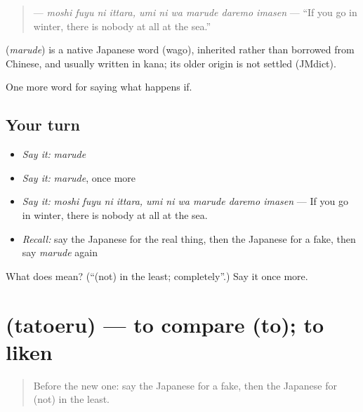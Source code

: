 \begin{quote}
\textbf{     } — \emph{moshi fuyu ni ittara, umi ni wa marude daremo imasen} — \textquotedblleft{}If you go in winter, there is nobody at all at the sea.\textquotedblright{}
\end{quote}

\begin{cousinweb}
\textbf{} (\emph{marude}) is a native Japanese word (wago), inherited rather than borrowed from Chinese, and usually written in kana; its older origin is not settled (JMdict).
\end{cousinweb}

\begin{grammarlens}[title={What you've built}]
One more word for saying what happens if.
\end{grammarlens}

\subsection*{Your turn}
\begin{itemize}
\raggedright
  \item \emph{Say it:} \emph{marude}
  \item \emph{Say it:} \emph{marude}, once more
  \item \emph{Say it:} \emph{moshi fuyu ni ittara, umi ni wa marude daremo imasen} — If you go in winter, there is nobody at all at the sea.
  \item \emph{Recall:} say the Japanese for the real thing, then the Japanese for a fake, then say \emph{marude} again
\end{itemize}

\begin{tcolorbox}[breakable,colback=teal!4,colframe=teal!35!black,title={Before you move on}]
What does  mean? (\textquotedblleft{}(not) in the least; completely\textquotedblright{}.) Say it once more.
\end{tcolorbox}
\section[\texorpdfstring{\ja{たとえる} (tatoeru)}{たとえる (tatoeru)}]{ (tatoeru) — to compare (to); to liken}

\label{lesson:JA-C525-tatoeru}



\begin{quote}
Before the new one: say the Japanese for a fake, then the Japanese for (not) in the least.
\end{quote}


